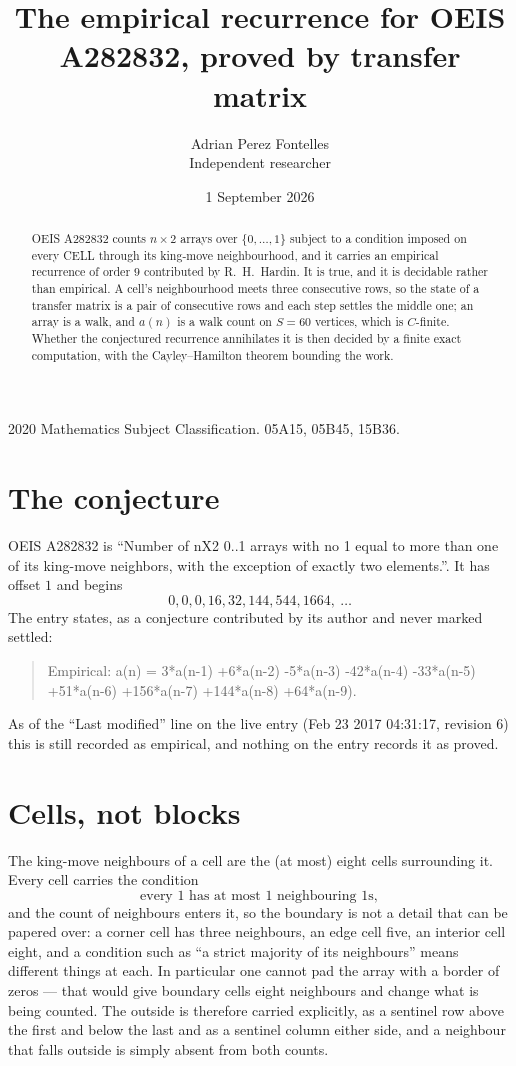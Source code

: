 \documentclass[11pt,a4paper]{article}
\title{The empirical recurrence for OEIS A282832, proved by transfer matrix}
\author{Adrian Perez Fontelles\\ \small Independent researcher}
\date{1 September 2026}
\theoremstyle{plain}
\theoremstyle{definition}
\begin{document}
\maketitle

\begin{abstract}
OEIS A282832 counts $n\times2$ arrays over $\{0,\dots,1\}$ subject to a condition imposed on
every CELL through its king-move neighbourhood, and it carries an empirical recurrence of
order $9$ contributed by R.~H.~Hardin. It is true, and it is decidable rather than
empirical. A cell's neighbourhood meets three consecutive rows, so the state of a transfer
matrix is a pair of consecutive rows and each step settles the middle one; an array is a
walk, and $a(n)$ is a walk count on $S=60$ vertices, which is $C$-finite. Whether the
conjectured recurrence annihilates it is then decided by a finite exact computation, with the
Cayley--Hamilton theorem bounding the work.
\end{abstract}

\noindent\small 2020 Mathematics Subject Classification. 05A15, 05B45, 15B36.\normalsize

\section{The conjecture}

OEIS A282832 is ``Number of nX2 0..1 arrays with no 1 equal to more than one of its king-move neighbors, with the exception of exactly two elements.''. It has offset $1$ and begins
\[
0, 0, 0, 16, 32, 144, 544, 1664,\ \dots
\]
The entry states, as a conjecture contributed by its author and never marked settled:
\begin{quote}
Empirical: a(n) = 3*a(n-1) +6*a(n-2) -5*a(n-3) -42*a(n-4) -33*a(n-5) +51*a(n-6) +156*a(n-7) +144*a(n-8) +64*a(n-9).
\end{quote}
As of the ``Last modified'' line on the live entry (Feb 23 2017 04:31:17, revision 6) this is still
recorded as empirical, and nothing on the entry records it as proved.

\section{Cells, not blocks}

The king-move neighbours of a cell are the (at most) eight cells surrounding it. Every cell
carries the condition
\[
\text{every }1\text{ has at most }1\text{ neighbouring }1\text{s},
\]
and the count of neighbours enters it, so the boundary is not a detail that can be papered
over: a corner cell has three neighbours, an edge cell five, an interior cell eight, and a
condition such as ``a strict majority of its neighbours'' means different things at each. In
particular one cannot pad the array with a border of zeros --- that would give boundary cells
eight neighbours and change what is being counted. The outside is therefore carried
explicitly, as a sentinel row above the first and below the last and as a sentinel column
either side, and a neighbour that falls outside is simply absent from both counts.
\end{document}
